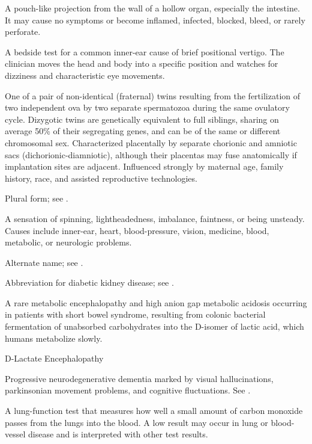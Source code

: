  A pouch-like projection from the wall of a hollow organ, especially the intestine. It may cause no symptoms or become inflamed, infected, blocked, bleed, or rarely perforate.

 A bedside test for a common inner-ear cause of brief positional vertigo. The clinician moves the head and body into a specific position and watches for dizziness and characteristic eye movements.

 One of a pair of non-identical (fraternal) twins resulting from the fertilization of two independent ova by two separate spermatozoa during the same ovulatory cycle. Dizygotic twins are genetically equivalent to full siblings, sharing on average 50\% of their segregating genes, and can be of the same or different chromosomal sex. Characterized placentally by separate chorionic and amniotic sacs (dichorionic-diamniotic), although their placentas may fuse anatomically if implantation sites are adjacent. Influenced strongly by maternal age, family history, race, and assisted reproductive technologies.

 Plural form; see .

 A sensation of spinning, lightheadedness, imbalance, faintness, or being unsteady. Causes include inner-ear, heart, blood-pressure, vision, medicine, blood, metabolic, or neurologic problems.

 Alternate name; see .

 Abbreviation for diabetic kidney disease; see .

 A rare metabolic encephalopathy and high anion gap metabolic acidosis occurring in patients with short bowel syndrome, resulting from colonic bacterial fermentation of unabsorbed carbohydrates into the D-isomer of lactic acid, which humans metabolize slowly.

\synonyms
D-Lactate Encephalopathy

 Progressive neurodegenerative dementia marked by visual hallucinations, parkinsonian movement problems, and cognitive fluctuations. See .

 A lung-function test that measures how well a small amount of carbon monoxide passes from the lungs into the blood. A low result may occur in lung or blood-vessel disease and is interpreted with other test results.

